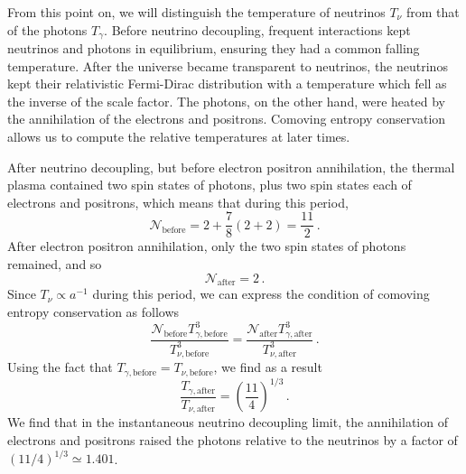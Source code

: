 From this point on, we will distinguish the temperature of neutrinos $T_\nu$ from that of the photons $T_\gamma$.  Before neutrino decoupling, frequent interactions kept neutrinos and photons in equilibrium, ensuring they had a common falling temperature.  After the universe became transparent to neutrinos, the neutrinos kept their relativistic Fermi-Dirac distribution with a temperature which fell as the inverse of the scale factor.  The photons, on the other hand, were heated by the annihilation of the electrons and positrons.  Comoving entropy conservation allows us to compute the relative temperatures at later times.

After neutrino decoupling, but before electron positron annihilation, the thermal plasma contained two spin states of photons, plus two spin states each of electrons and positrons, which means that during this period,
\begin{equation}
	\mathcal{N}_{\mathrm{before}} = 2 + \frac{7}{8}(2+2) = \frac{11}{2} \, .
\end{equation}
After electron positron annihilation, only the two spin states of photons remained, and so
\begin{equation}
	\mathcal{N}_{\mathrm{after}} = 2 \, .
\end{equation}
Since $T_\nu\propto a^{-1}$ during this period, we can express the condition of comoving entropy conservation as follows
\begin{equation}
	\frac{\mathcal{N}_{\mathrm{before}}T_{\gamma,\mathrm{before}}^3}{T_{\nu,\mathrm{before}}^3} = \frac{\mathcal{N}_{\mathrm{after}}T_{\gamma,\mathrm{after}}^3}{T_{\nu,\mathrm{after}}^3} \, .
\end{equation}
Using the fact that $T_{\gamma,\mathrm{before}} = T_{\nu,\mathrm{before}}$, we find as a result
\begin{equation}
	\frac{T_{\gamma,\mathrm{after}}}{T_{\nu,\mathrm{after}}} = \left(\frac{11}{4}\right)^{1/3} \, .
\end{equation}
We find that in the instantaneous neutrino decoupling limit, the annihilation of electrons and positrons raised the photons relative to the neutrinos by a factor of $(11/4)^{1/3}\simeq1.401$.

